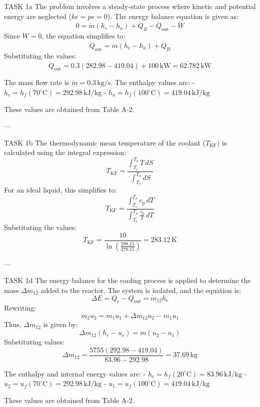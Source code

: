 TASK 1a  
The problem involves a steady-state process where kinetic and potential energy are neglected (\( ke = pe = 0 \)). The energy balance equation is given as:  
\[
0 = \dot{m}(h_e - h_a) + \dot{Q}_R - \dot{Q}_{\text{out}} - W
\]  
Since \( W = 0 \), the equation simplifies to:  
\[
\dot{Q}_{\text{out}} = \dot{m}(h_e - h_a) + \dot{Q}_R
\]  
Substituting the values:  
\[
\dot{Q}_{\text{out}} = 0.3 \left( 282.98 - 419.04 \right) + 100 \, \text{kW} = 62.782 \, \text{kW}
\]  

The mass flow rate is \( \dot{m} = 0.3 \, \text{kg/s} \). The enthalpy values are:  
- \( h_e = h_f(70^\circ\text{C}) = 292.98 \, \text{kJ/kg} \)  
- \( h_a = h_f(100^\circ\text{C}) = 419.04 \, \text{kJ/kg} \)  

These values are obtained from Table A-2.  

---

TASK 1b  
The thermodynamic mean temperature of the coolant (\( T_{\text{KF}} \)) is calculated using the integral expression:  
\[
T_{\text{KF}} = \frac{\int_{T_e}^{T_a} T \, dS}{\int_{T_e}^{T_a} dS}
\]  
For an ideal liquid, this simplifies to:  
\[
T_{\text{KF}} = \frac{\int_{T_e}^{T_a} c_p \, dT}{\int_{T_e}^{T_a} \frac{c_p}{T} \, dT}
\]  
Substituting the values:  
\[
T_{\text{KF}} = \frac{10}{\ln\left(\frac{288.15}{278.15}\right)} = 283.12 \, \text{K}
\]  

---

TASK 1d  
The energy balance for the cooling process is applied to determine the mass \( \Delta m_{12} \) added to the reactor. The system is isolated, and the equation is:  
\[
\Delta E = Q_e - Q_{\text{out}} = \dot{m}_{12} h_e
\]  
Rewriting:  
\[
m_2 u_2 = m_1 u_1 + \Delta m_{12} u_2 - m_1 u_1
\]  
Thus, \( \Delta m_{12} \) is given by:  
\[
\Delta m_{12}(h_e - u_e) = m(u_2 - u_1)
\]  
Substituting values:  
\[
\Delta m_{12} = \frac{5755 \left( 292.98 - 419.04 \right)}{83.96 - 292.98} = 37.69 \, \text{kg}
\]  

The enthalpy and internal energy values are:  
- \( h_e = h_f(20^\circ\text{C}) = 83.96 \, \text{kJ/kg} \)  
- \( u_2 = u_f(70^\circ\text{C}) = 292.98 \, \text{kJ/kg} \)  
- \( u_1 = u_f(100^\circ\text{C}) = 419.04 \, \text{kJ/kg} \)  

These values are obtained from Table A-2.